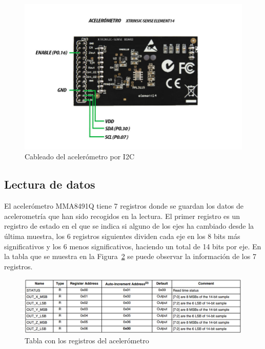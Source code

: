 \begin{figure}[h]%
	\centering
    \includegraphics[scale=0.6]{figures/estructura_xtrinsic.jpg}
    \caption[Cableado del acelerómetro por I2C]{Cableado del acelerómetro por I2C}
   	\label{figuraXtrinsic}
\end{figure}

\subsection{Lectura de datos}
\label{makereference5.1.1}

El acelerómetro MMA8491Q tiene 7 registros donde se guardan los datos de acelerometría que han sido recogidos en la lectura. El primer registro es un registro de estado en el que se indica si alguno de los ejes ha cambiado desde la última muestra, los 6 registros siguientes dividen cada eje en los 8 bits más significativos y los 6 menos significativos, haciendo un total de 14 bits por eje. En la tabla que se muestra en la Figura~\ref{figuraRegistrosAcc} se puede observar la información de los 7 registros.

\begin{figure}[h]%
	\centering
    \includegraphics[width=\textwidth]{figures/registros_Acelerometro.png} %
    \caption[Registros del acelerómetro]{Tabla con los registros del acelerómetro~\cite{DatasheetAcc}}
   	\label{figuraRegistrosAcc}
\end{figure}

